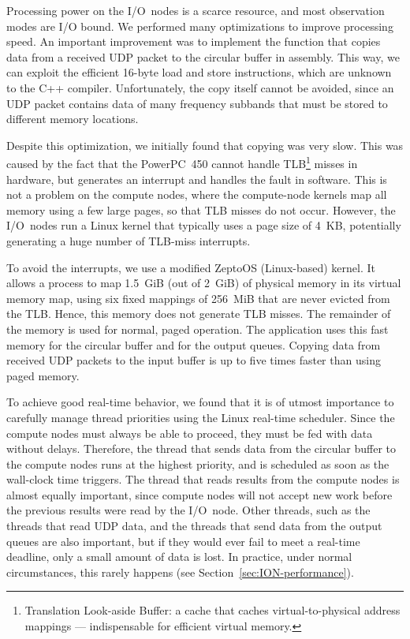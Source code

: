 \documentclass{sig-alternate}
\begin{document}
Processing power on the I/O~nodes is a scarce resource, and most observation
modes are I/O bound.
We performed many optimizations to improve processing speed.
An important improvement was to implement the function that copies data from a
received UDP packet to the circular buffer in assembly.
This way, we can exploit the efficient 16-byte load and
store instructions, which are unknown to the C++ compiler.
Unfortunately, the copy itself cannot be avoided, since an UDP packet contains
data of many frequency subbands that must be stored to different memory
locations.

Despite this optimization, we initially found that copying was very slow.
This was caused by the fact that the PowerPC~450 cannot handle
TLB\footnote{Translation Look-aside Buffer: a cache that caches
virtual-to-physical address mappings --- indispensable for efficient virtual
memory.} misses in hardware, but generates an interrupt and handles the fault
in software.
This is not a problem on the compute nodes, where the compute-node kernels 
map all memory using a few large pages, so that TLB misses do not occur.
However, the I/O~nodes run a Linux kernel that typically uses a page size of
4~KB, potentially generating a huge number of TLB-miss interrupts.

To avoid the interrupts, we use a modified ZeptoOS (Linux-based)
kernel\cite{Kazutomo:09}.
It allows a process to map 1.5~GiB (out of 2~GiB) of physical memory in its
virtual memory map, using six fixed mappings of 256~MiB that are never evicted
from the TLB.
Hence, this memory does not generate TLB misses.
The remainder of the memory is used for normal, paged operation.
The application uses this fast memory for the circular buffer and for the
output queues.
Copying data from received UDP packets to the input buffer is up to five times
faster than using paged memory.

To achieve good real-time behavior, we found that it is of utmost importance
to carefully manage thread priorities using the Linux real-time scheduler.
Since the compute nodes must always be able to proceed, they must be fed with
data without delays.
Therefore, the thread that sends data from the circular buffer to the
compute nodes runs at the highest priority, and is scheduled as soon as the
wall-clock time triggers.
The thread that reads results from the compute nodes is almost equally
important, since compute nodes will not accept new work before the previous
results were read by the I/O~node.
Other threads, such as the threads that read UDP data, and the threads that
send data from the output queues are also important, but if they would ever
fail to meet a real-time deadline, only a small amount of data is lost.
In practice, under normal circumstances, this rarely happens
(see Section~\ref{sec:ION-performance}).
\end{document}
